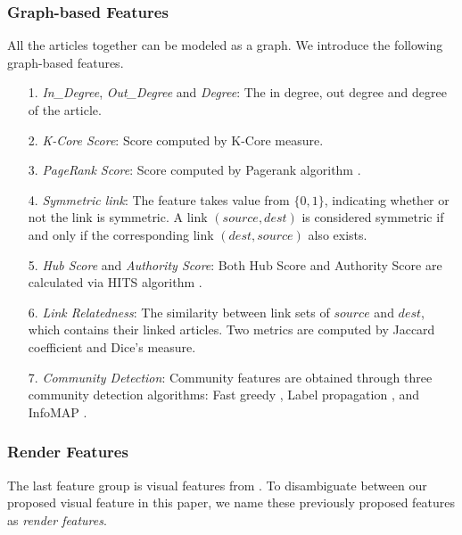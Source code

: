 \subsubsection{Graph-based Features} \label{graph-based_features}

All the articles together can be modeled as a graph. We introduce the following graph-based features.

\begin{itemize}

    \item[1.] \emph{In\_Degree}, \emph{Out\_Degree} and \emph{Degree}: The in degree, out degree and degree of the article.

    \item[2.] \emph{K-Core Score}: Score computed by K-Core measure.

    \item[3.] \emph{PageRank Score}: Score computed by Pagerank algorithm \cite{brin1998anatomy}.

    \item[4.] \emph{Symmetric link}: The feature takes value from $\{0,1\}$, indicating whether or not the link is symmetric. A link $(source, dest)$ is considered symmetric if and only if the corresponding link $(dest, source)$ also exists. 

    \item[5.] \emph{Hub Score} and \emph{Authority Score}: Both Hub Score and Authority Score are calculated via HITS algorithm \cite{kleinberg1998authoritative}.

    \item[6.] \emph{Link Relatedness}: The similarity between link sets of $source$ and $dest$, which contains their linked articles. Two metrics are computed by Jaccard coefficient and Dice's measure.

    \item[7.] \emph{Community Detection}: Community features are obtained through three community detection algorithms: Fast greedy \cite{clauset2004finding}, Label propagation \cite{raghavan2007near}, and InfoMAP \cite{rosvall2009map}.

\end{itemize}

\subsubsection{Render Features} \label{render_features}

The last feature group is visual features from \cite{dimitrov2017makes}. To disambiguate between our proposed visual feature in this paper, we name these previously proposed features as \emph{render features}.

